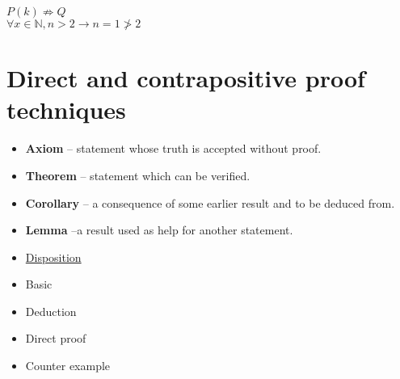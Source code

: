 \documentclass[english,10pt,a4paper]{article}
\begin{document}
\begin{theo} 
$P(k) \not \Rightarrow Q$\\
$\forall x \in \mathbb{N}, n > 2 \rightarrow n= 1 \not > 2$
\end{theo}



\newpage
\section{Direct and contrapositive proof  techniques}

\begin{minipage}[t]{0.7\linewidth}
\begin{theo}[Basic] 
\begin{itemize}
\item \textbf{Axiom} -- statement whose truth is accepted without proof.
\item \textbf{Theorem} -- statement which can be verified.
\item \textbf{Corollary} -- a consequence of some earlier result and to be deduced from.
\item \textbf{Lemma} --a result used as help for another statement.
\end{itemize}
\end{theo}
\end{minipage}
\hspace{0.1cm}
\begin{minipage}[t]{0.25\linewidth}
\begin{itemize}
\item[] \underline{Disposition}
\item Basic
\item Deduction
\item Direct proof
\item Counter example
\end{itemize}
\end{minipage}
\end{document}
